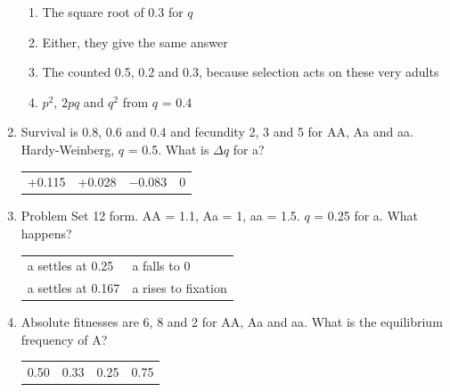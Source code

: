 \documentclass[11pt]{article}
\newcommand{\work}[1]{\par\vspace{#1}}
\begin{document}
\begin{enumerate}[label=\textbf{\arabic*.}, leftmargin=2em, itemsep=1.4em]
\par\smallskip
\begin{enumerate}[label={}, leftmargin=2.4em, labelwidth=0pt, itemsep=2pt, topsep=0pt]
\item \hspace*{-2.4em}The square root of 0.3 for \(q\)
\item \hspace*{-2.4em}Either, they give the same answer
\item \hspace*{-2.4em}The counted 0.5, 0.2 and 0.3, because selection acts on these very adults
\item \hspace*{-2.4em}\(p^2\), \(2pq\) and \(q^2\) from \(q\) = 0.4
\end{enumerate}
\item Survival is 0.8, 0.6 and 0.4 and fecundity 2, 3 and 5 for AA, Aa and aa. Hardy-Weinberg, \(q\) = 0.5. What is \(\Delta q\) for a?
\par\smallskip\noindent\begin{tabularx}{\linewidth}{@{}YYYY@{}}
+0.115 & +0.028 & \(-\)0.083 & 0 \\
\end{tabularx}
\work{1.6cm}
\item Problem Set 12 form. AA = 1.1, Aa = 1, aa = 1.5. \(q\) = 0.25 for a. What happens?
\par\smallskip\noindent\begin{tabularx}{\linewidth}{@{}YY@{}}
a settles at 0.25 & a falls to 0 \\[3pt]
a settles at 0.167 & a rises to fixation \\
\end{tabularx}
\item Absolute fitnesses are 6, 8 and 2 for AA, Aa and aa. What is the equilibrium frequency of A?
\par\smallskip\noindent\begin{tabularx}{\linewidth}{@{}YYYY@{}}
0.50 & 0.33 & 0.25 & 0.75 \\
\end{tabularx}

\end{enumerate}
\end{document}
